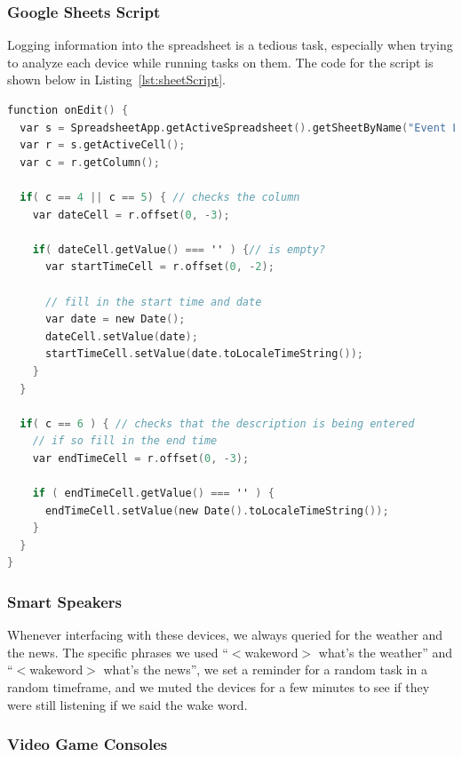 \subsubsection{Google Sheets Script}

Logging information into the spreadsheet is a tedious task, especially when trying to analyze each device while running tasks on them. The code for the script is shown below in Listing~\ref{lst:sheetScript}.

\begin{minipage}{\textwidth}
\begin{lstlisting}[basicstyle=\linespread{0.8}\footnotesize, language=C,label={lst:sheetScript},caption={Open and Read from a Socket},captionpos=b]
function onEdit() {
  var s = SpreadsheetApp.getActiveSpreadsheet().getSheetByName("Event Log");
  var r = s.getActiveCell();
  var c = r.getColumn();

  if( c == 4 || c == 5) { // checks the column
    var dateCell = r.offset(0, -3);

    if( dateCell.getValue() === '' ) {// is empty?
      var startTimeCell = r.offset(0, -2);

      // fill in the start time and date
      var date = new Date();
      dateCell.setValue(date);
      startTimeCell.setValue(date.toLocaleTimeString());
    }
  }

  if( c == 6 ) { // checks that the description is being entered
    // if so fill in the end time
    var endTimeCell = r.offset(0, -3);

    if ( endTimeCell.getValue() === '' ) {
      endTimeCell.setValue(new Date().toLocaleTimeString());
    }
  }
}
\end{lstlisting}
\end{minipage}

\subsubsection{Smart Speakers}

Whenever interfacing with these devices, we always queried for the weather and the news. The specific phrases we used ``$<$wakeword$>$ what's the weather'' and ``$<$wakeword$>$ what's the news'', we  set a reminder for a random task in a random timeframe, and we muted the devices for a few minutes to see if they were still listening if we said the wake word.

\subsubsection{Video Game Consoles}

